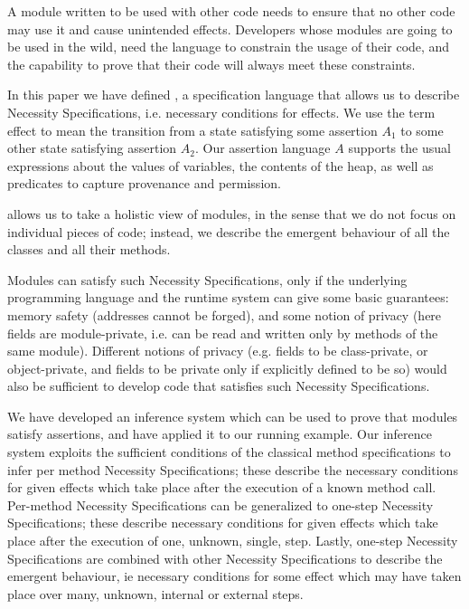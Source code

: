 A module written to be  used with other code needs to ensure that no other code 
may use it and cause unintended effects. Developers whose modules are going to be used in the wild, need the language to constrain the usage of their code, and the capability to prove that their code will always meet these constraints. 

In this paper we have defined \Chainmail, a specification language that allows us to
describe Necessity Specifications, i.e. necessary  conditions for effects.
We use the term  effect to mean the transition from a  state satisfying some assertion 
$A_1$ to some  other state satisfying  assertion $A_2$. 
Our assertion language $A$ supports the usual expressions about the values of
variables, the contents of the heap, as well as predicates to capture provenance 
and permission.

\Chainmail allows us to take a holistic view of modules, in the sense that we do not focus
on individual pieces of code; instead, we  describe  the emergent behaviour of all
the classes and all their methods. 

Modules can satisfy such Necessity Specifications, only if
the underlying programming language and the runtime system 
can give some basic guarantees:
 memory safety (addresses cannot be forged), 
and some notion of privacy (here fields are module-private, i.e. can be read and written only
by methods of the same module). Different notions of privacy 
(e.g. fields to be class-private,
or object-private, and fields to be private only if explicitly defined to be so)  would
also be sufficient to develop code that satisfies such Necessity Specifications.

We have developed an inference system which can be used to prove that modules satisfy  
\Chainmail assertions, and have applied it to our running example. 
Our inference system exploits the sufficient conditions of the classical
method specifications to infer per method Necessity Specifications;  
these describe the necessary conditions for given effects
which take place after the execution of a known method call. 
Per-method Necessity Specifications can be generalized to one-step
 Necessity Specifications; these describe necessary conditions for
 given effects  which take place after the execution of one, 
 unknown, single, step. 
 Lastly, one-step
Necessity Specifications are combined with other Necessity Specifications
 to describe the emergent behaviour, ie  necessary conditions for some effect which
 may have taken place over many, unknown, internal or external steps.
 
